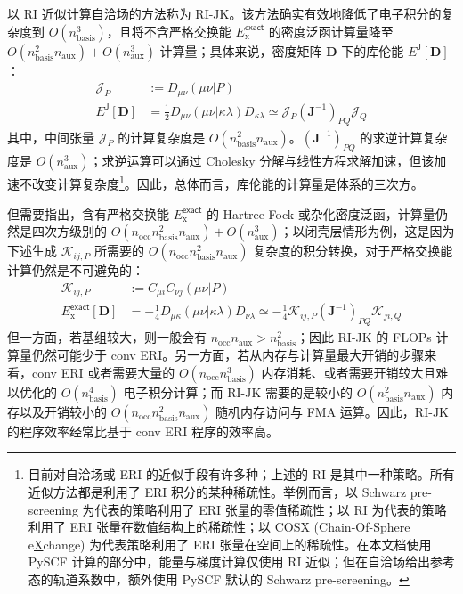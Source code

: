 以 RI 近似计算自洽场的方法称为 RI-JK。该方法确实有效地降低了电子积分的复杂度到 $O(n_\mathrm{basis}^3)$，且将不含严格交换能 $E_\mathrm{x}^\textsf{exact}$ 的密度泛函计算量降至 $O(n_\mathrm{basis}^2 n_\mathrm{aux}) + O(n_\mathrm{aux}^3)$ 计算量；具体来说，密度矩阵 $\mathbf{D}$ 下的库伦能 $E^\textsf{J} [\mathbf{D}]$：
\begin{align*}
  \mathcal{J}_P &:= D_{\mu \nu} (\mu \nu | P) \\
  E^\textsf{J} [\mathbf{D}] &= \frac{1}{2} D_{\mu \nu} (\mu \nu | \kappa \lambda) D_{\kappa \lambda} \simeq \mathcal{J}_P (\mathbf{J}^{-1})_{PQ} \mathcal{J}_Q
\end{align*}
其中，中间张量 $\mathcal{J}_P$ 的计算复杂度是 $O(n_\mathrm{basis}^2 n_\mathrm{aux})$。$(\mathbf{J}^{-1})_{PQ}$ 的求逆计算复杂度是 $O(n_\mathrm{aux}^3)$；求逆运算可以通过 Cholesky 分解与线性方程求解加速，但该加速不改变计算复杂度\footnote{目前对自洽场或 ERI 的近似手段有许多种；上述的 RI 是其中一种策略。所有近似方法都是利用了 ERI 积分的某种稀疏性。举例而言，以 Schwarz pre-screening 为代表的策略利用了 ERI 张量的零值稀疏性\cite{Horn-Ahlrichs.JCC.1991}；以 RI 为代表的策略利用了 ERI 张量在数值结构上的稀疏性\cite{Vahtras-Feyereisen.CPL.1993}；以 COSX (\underline{C}hain-\underline{O}f-\underline{S}phere e\underline{X}change) 为代表策略利用了 ERI 张量在空间上的稀疏性\cite{Neese-Becker.CP.2009}。在本文档使用 PySCF 计算的部分中，能量与梯度计算仅使用 RI 近似；但在自洽场给出参考态的轨道系数中，额外使用 PySCF 默认的 Schwarz pre-screening。}。因此，总体而言，库伦能的计算量是体系的三次方。

但需要指出，含有严格交换能 $E_\mathrm{x}^\textsf{exact}$ 的 Hartree-Fock 或杂化密度泛函，计算量仍然是四次方级别的 $O(n_\mathrm{occ} n_\mathrm{basis}^2 n_\mathrm{aux}) + O(n_\mathrm{aux}^3)$；以闭壳层情形为例，这是因为下述生成 $\mathcal{K}_{ij, P}$ 所需要的 $O(n_\mathrm{occ} n_\mathrm{basis}^2 n_\mathrm{aux})$ 复杂度的积分转换，对于严格交换能计算仍然是不可避免的：
\begin{align*}
  \mathcal{K}_{ij, P} &:= C_{\mu i} C_{\nu j} (\mu \nu | P) \\
  E_\mathrm{x}^\textsf{exact} [\mathbf{D}] &= - \frac{1}{4} D_{\mu \kappa} (\mu \nu | \kappa \lambda) D_{\nu \lambda} \simeq - \frac{1}{4} \mathcal{K}_{ij, P} (\mathbf{J}^{-1})_{PQ} \mathcal{K}_{ji, Q}
\end{align*}
但一方面，若基组较大，则一般会有 $n_\mathrm{occ} n_\mathrm{aux} > n_\mathrm{basis}^2$；因此 RI-JK 的 FLOPs 计算量仍然可能少于 conv ERI。另一方面，若从内存与计算量最大开销的步骤来看，conv ERI 或者需要大量的 $O(n_\mathrm{occ} n_\mathrm{basis}^3)$ 内存消耗、或者需要开销较大且难以优化的 $O(n_\mathrm{basis}^4)$ 电子积分计算；而 RI-JK 需要的是较小的 $O(n_\mathrm{basis}^2 n_\mathrm{aux})$ 内存以及开销较小的 $O(n_\mathrm{occ} n_\mathrm{basis}^2 n_\mathrm{aux})$ 随机内存访问与 FMA 运算。因此，RI-JK 的程序效率经常比基于 conv ERI 程序的效率高。


